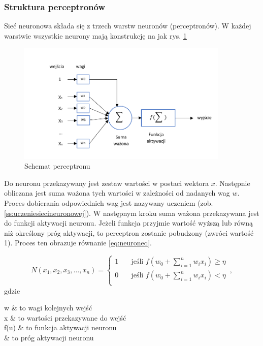 \documentclass[twoside]{iisthesis}
\begin{document}
		 \subsubsection{Struktura perceptronów}
		 \label{sss:strukturaperceptronow}
		 
		 Sieć neuronowa składa się z trzech warstw neuronów (perceptronów). W każdej warstwie wszystkie neurony mają konstrukcję na jak rys. \ref{fig:schematneuronu}
		 
 		 \begin{figure}[!ht] 		 		 	
	 		 	\includegraphics[width=0.9\textwidth]{schematneuron}
	 		 	\caption{Schemat perceptronu}
	 		 	\label{fig:schematneuronu}
 		 \end{figure}
		 
		 Do neuronu przekazywany jest zestaw wartości w postaci wektora $x$. Następnie obliczana jest suma ważona tych wartości w zależności od nadanych wag $w$. Proces dobierania odpowiednich wag jest nazywany uczeniem (zob. \ref{ss:uczeniesiecineuronowej}). W następnym kroku suma ważona przekazywana jest do funkcji aktywacji neuronu. Jeżeli funkcja przyjmie wartość wyższą lub równą niż określony próg aktywacji, to perceptron zostanie pobudzony (zwróci wartość 1). Proces ten obrazuje równanie \ref{eq:neuroneq}.
		 
		 \begin{equation}
		 \label{eq:neuroneq}
		 N(x_1, x_2, x_3, \ldots, x_n) = 
			 \begin{cases}
			 1       & \quad \text{jeśli } f(w_0 + \sum_{i=1}^{n}w_ix_i) \geq \eta\\
			 0		 & \quad \text{jeśli } f(w_0 + \sum_{i=1}^{n}w_ix_i) < \eta\\
			 \end{cases}
		 \,,
		 \end{equation}		 
		 gdzie
		 
		 \begin{conditions*}
		 	w & to wagi kolejnych wejść \\
		 	x & to wartości przekazywane do wejść \\
		 	f(u) & to funkcja aktywacji neuronu \\
		 	\eta & to próg aktywacji neuronu
		 \end{conditions*} 
		 
\end{document}

